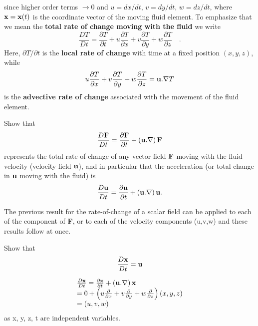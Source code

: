 \documentclass[10pt]{report}
\begin{document}
since higher order terms $\to0$ and $u = dx/dt$, $v = dy/dt$, $w = dz/dt$, where
${\bf x} = {\bf x}(t)$ is the coordinate vector of the
moving fluid element. To emphasize that we mean the \textbf{total rate of
change moving with the fluid} we write
\begin{equation}
\label{eq1}
\frac{DT}{Dt}=\frac{\partial T}{\partial t}+u\frac{\partial T}{\partial
x}+v\frac{\partial T}{\partial y}+w\frac{\partial T}{\partial z}\quad .
\end{equation}
Here, $\partial T/\partial t$ is the \textbf{local rate of change} with
time at a fixed position $(x,y,z)$, while
\[
u\frac{\partial T}{\partial x}+v\frac{\partial T}{\partial
y}+w\frac{\partial T}{\partial z}={\bf u}. \nabla T
\]
is the \textbf{advective rate of change} associated with the movement of the
fluid element.

\begin{examplebox}
Show that
\[ \frac{D{{\bf F}}}{Dt}=\frac{\partial {{\bf F}}}{\partial
t}+\left( {{{\bf u}}. \nabla } \right){{\bf F}}\]
represents the
total rate-of-change of any vector field ${\bf F}$ moving with the fluid
velocity (velocity field ${\bf u}$), and in particular that the
acceleration (or total change in ${\bf u}$ moving with the fluid) is
\[ \frac{D{{\bf u}}}{Dt}=\frac{\partial {{\bf u}}}{\partial t}+\left(
{{{\bf u}}. \nabla } \right){{\bf u}}. \]

\begin{examplesolution2}
	The previous result for the rate-of-change of a scalar
	field can be applied to each of the component of \textbf{F}, or to each of
	the velocity components (u,v,w) and these results follow at once.
\end{examplesolution2}
\end{examplebox}

\begin{examplebox}
Show that \[\frac{D{{\bf x}}}{Dt}={{\bf u}}\]

\begin{examplesolution2}
	\[
	\begin{array}{l}
	\frac{D{{\bf x}}}{Dt}=\frac{\partial {{\bf x}}}{\partial t}+\left(
	{{{\bf u}}. \nabla } \right){{\bf x}} \\
	=0+\left( {u\frac{\partial }{\partial x}+v\frac{\partial }{\partial
	y}+w\frac{\partial }{\partial z}} \right)\left( {x,y,z} \right) \\
	=\left( {u,v,w} \right) \\
	\end{array}
	\]
	as x, y, z, t are independent variables.
\end{examplesolution2}
\end{examplebox}
\end{document}
